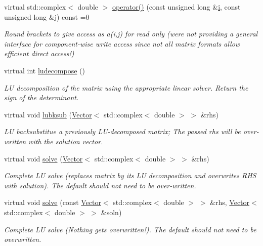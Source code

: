 \begin{DoxyCompactItemize}
virtual std\+::complex$<$ double $>$ \hyperlink{classoomph_1_1ComplexMatrixBase_a78d1185ec8249fec5855d01129a1c870}{operator()} (const unsigned long \&\hyperlink{cfortran_8h_adb50e893b86b3e55e751a42eab3cba82}{i}, const unsigned long \&j) const =0
\begin{DoxyCompactList}\small\item\em Round brackets to give access as a(i,j) for read only (we\textquotesingle{}re not providing a general interface for component-\/wise write access since not all matrix formats allow efficient direct access!) \end{DoxyCompactList}\item 
virtual int \hyperlink{classoomph_1_1ComplexMatrixBase_a11e1beeb7767e9bc5e511c17f80f097f}{ludecompose} ()
\begin{DoxyCompactList}\small\item\em LU decomposition of the matrix using the appropriate linear solver. Return the sign of the determinant. \end{DoxyCompactList}\item 
virtual void \hyperlink{classoomph_1_1ComplexMatrixBase_aa0e444d60d4ec9e35a6903ab88baaf62}{lubksub} (\hyperlink{classoomph_1_1Vector}{Vector}$<$ std\+::complex$<$ double $>$ $>$ \&rhs)
\begin{DoxyCompactList}\small\item\em LU backsubstitue a previously L\+U-\/decomposed matrix; The passed rhs will be over-\/written with the solution vector. \end{DoxyCompactList}\item 
virtual void \hyperlink{classoomph_1_1ComplexMatrixBase_a131e601fd0e82e811b26a3c11a455d0e}{solve} (\hyperlink{classoomph_1_1Vector}{Vector}$<$ std\+::complex$<$ double $>$ $>$ \&rhs)
\begin{DoxyCompactList}\small\item\em Complete LU solve (replaces matrix by its LU decomposition and overwrites R\+HS with solution). The default should not need to be over-\/written. \end{DoxyCompactList}\item 
virtual void \hyperlink{classoomph_1_1ComplexMatrixBase_a223cef84c48a2aa9fb387ed4ffaaf48a}{solve} (const \hyperlink{classoomph_1_1Vector}{Vector}$<$ std\+::complex$<$ double $>$ $>$ \&rhs, \hyperlink{classoomph_1_1Vector}{Vector}$<$ std\+::complex$<$ double $>$ $>$ \&soln)
\begin{DoxyCompactList}\small\item\em Complete LU solve (Nothing gets overwritten!). The default should not need to be overwritten. \end{DoxyCompactList}\item 

\end{DoxyCompactItemize}
